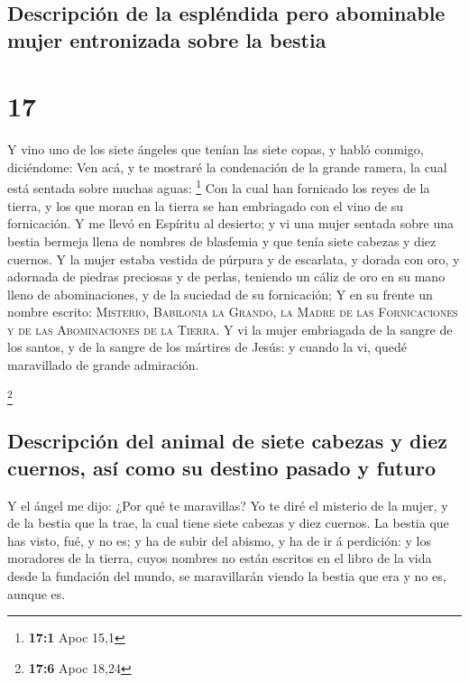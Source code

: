 \hypertarget{descripciuxf3n-de-la-espluxe9ndida-pero-abominable-mujer-entronizada-sobre-la-bestia}{%
\subsection{Descripción de la espléndida pero abominable mujer
entronizada sobre la
bestia}\label{descripciuxf3n-de-la-espluxe9ndida-pero-abominable-mujer-entronizada-sobre-la-bestia}}

\hypertarget{section-16}{%
\section{17}\label{section-16}}

 Y vino uno de los siete ángeles que tenían las siete
copas, y habló conmigo, diciéndome: Ven acá, y te mostraré la
condenación de la grande ramera, la cual está sentada sobre muchas
aguas: \footnote{\textbf{17:1} Apoc 15,1}  Con la cual han
fornicado los reyes de la tierra, y los que moran en la tierra se han
embriagado con el vino de su fornicación.  Y me llevó en
Espíritu al desierto; y vi una mujer sentada sobre una bestia bermeja
llena de nombres de blasfemia y que tenía siete cabezas y diez cuernos.
 Y la mujer estaba vestida de púrpura y de escarlata, y
dorada con oro, y adornada de piedras preciosas y de perlas, teniendo un
cáliz de oro en su mano lleno de abominaciones, y de la suciedad de su
fornicación;  Y en su frente un nombre escrito:
\textsc{Misterio, Babilonia la Grando, la Madre de las Fornicaciones y
de las Abominaciones de la Tierra}.  Y vi la mujer
embriagada de la sangre de los santos, y de la sangre de los mártires de
Jesús: y cuando la vi, quedé maravillado de grande admiración.

\footnote{\textbf{17:6} Apoc 18,24}

\hypertarget{descripciuxf3n-del-animal-de-siete-cabezas-y-diez-cuernos-asuxed-como-su-destino-pasado-y-futuro}{%
\subsection{Descripción del animal de siete cabezas y diez cuernos, así
como su destino pasado y
futuro}\label{descripciuxf3n-del-animal-de-siete-cabezas-y-diez-cuernos-asuxed-como-su-destino-pasado-y-futuro}}

 Y el ángel me dijo: ¿Por qué te maravillas? Yo te diré el
misterio de la mujer, y de la bestia que la trae, la cual tiene siete
cabezas y diez cuernos.  La bestia que has visto, fué, y
no es; y ha de subir del abismo, y ha de ir á perdición: y los moradores
de la tierra, cuyos nombres no están escritos en el libro de la vida
desde la fundación del mundo, se maravillarán viendo la bestia que era y
no es, aunque es.

